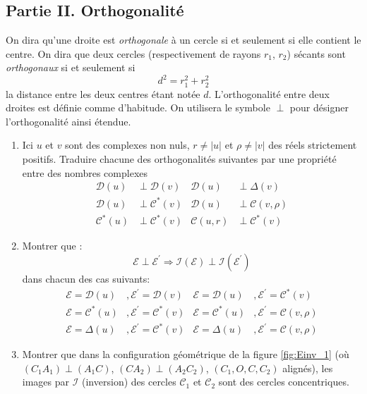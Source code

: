 \subsection*{Partie II. Orthogonalité}
On dira qu'une droite est \emph{orthogonale} à un cercle si et seulement si elle contient le centre.\newline
On dira que deux cercles (respectivement de rayons $r_1$, $r_2$) sécants sont \emph{orthogonaux} si et seulement si
\begin{displaymath}
 d^2 = r_1^2 + r_2^2
\end{displaymath}
la distance entre les deux centres étant notée $d$.\newline
L'orthogonalité entre deux droites est définie comme d'habitude. On utilisera le symbole $\perp$ pour désigner l'orthogonalité ainsi étendue.
\begin{enumerate}
 \item Ici $u$ et $v$ sont des complexes non nuls, $r\neq|u|$ et $\rho\neq|v|$ des réels strictement positifs. Traduire chacune des orthogonalités suivantes par une propriété entre des nombres complexes
\begin{align*}
 \mathcal D(u) &\perp \mathcal D(v)  & \mathcal D(u) &\perp \Delta(v) \\
 \mathcal D(u) &\perp \mathcal C^*(v) & \mathcal D(u) &\perp \mathcal C(v,\rho) \\
 \mathcal C^*(u) &\perp \mathcal C^*(v) & \mathcal C(u,r) &\perp \mathcal C^*(v)
\end{align*}

\item Montrer que :
\begin{displaymath}
 \mathcal E \perp \mathcal E^\prime \Rightarrow \mathcal I(\mathcal E) \perp \mathcal I(\mathcal E^\prime)
\end{displaymath}
dans chacun des cas suivants:
\begin{align*}
 \mathcal E =\mathcal D(u) &,\mathcal E^\prime =\mathcal D(v) & \mathcal E =\mathcal D(u) &,\mathcal E^\prime =\mathcal C^*(v) \\
 \mathcal E =\mathcal C^*(u) &,\mathcal E^\prime =\mathcal C^*(v) &  \mathcal E =\mathcal C^*(u) &,\mathcal E^\prime =\mathcal C(v,\rho)\\
\mathcal E =\Delta(u) &,\mathcal E^\prime =\mathcal C^*(v) & \mathcal E =\Delta(u) &,\mathcal E^\prime =\mathcal C(v,\rho)
\end{align*}

\item Montrer que dans la configuration géométrique de la figure \ref{fig:Einv_1} (où $(C_1A_1)\perp(A_1C)$, $(CA_2)\perp(A_2C_2)$, $(C_1, O, C, C_2)$ alignés), les images par $\mathcal{I}$ (inversion) des cercles $\mathcal C_1$ et $\mathcal C_2$ sont des cercles concentriques.
\end{enumerate}
